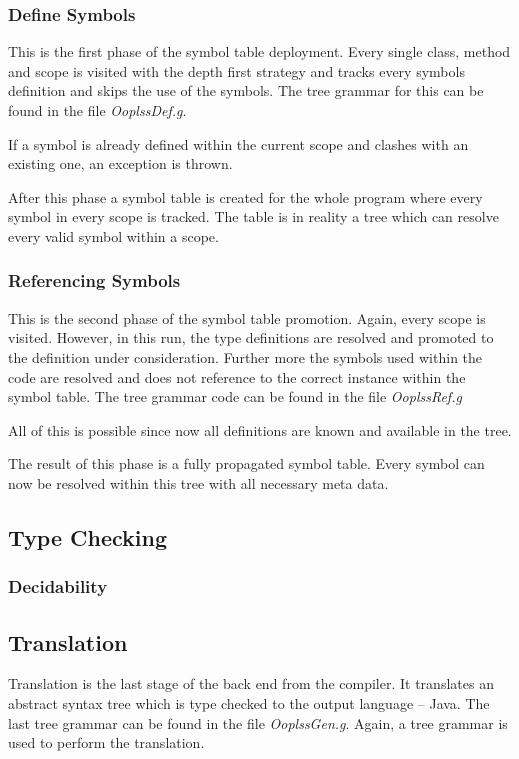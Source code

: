 \subsubsection{Define Symbols}
This is the first phase of the symbol table deployment. Every single
class, method and scope is visited with the depth first strategy and
tracks every symbols definition and skips the use of the symbols. The
tree grammar for this can be found in the file \emph{OoplssDef.g}.

If a symbol is already defined within the current scope and clashes with
an existing one, an exception is thrown.

After this phase a symbol table is created for the whole program where
every symbol in every scope is tracked. The table is in reality a tree
which can resolve every valid symbol within a scope.

\subsubsection{Referencing Symbols}
This is the second phase of the symbol table promotion. Again, every scope
is visited. However, in this run, the type definitions are resolved and
promoted to the definition under consideration. Further more the symbols
used within the code are resolved and does not reference to the correct
instance within the symbol table. The tree grammar code can be found in
the file \emph{OoplssRef.g}

All of this is possible since now all definitions are known and available
in the tree.

The result of this phase is a fully propagated symbol table. Every symbol can
now be resolved within this tree with all necessary meta data.

\subsection{Type Checking}
\subsubsection{Decidability}

\subsection{Translation}
Translation is the last stage of the back end from the compiler. It
translates an abstract syntax tree which is type checked to the
output language -- Java. The last tree grammar can be found in the
file \emph{OoplssGen.g}. Again, a tree grammar is used to perform the
translation.

